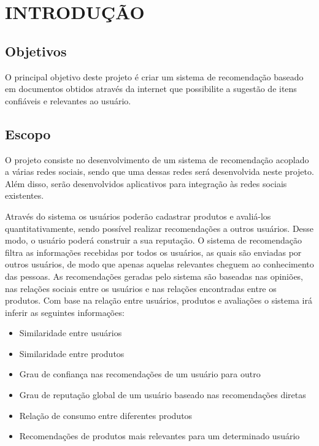 \chapter{INTRODUÇÃO} 

\section{Objetivos} %

 O principal objetivo deste projeto é criar um sistema de recomendação baseado em documentos obtidos através da internet que possibilite a sugestão de itens confiáveis e relevantes ao usuário.

\section{Escopo}

 O projeto consiste no desenvolvimento de um sistema de recomendação acoplado a várias redes sociais, sendo que uma dessas redes será desenvolvida neste projeto. Além disso, serão desenvolvidos aplicativos para integração às redes sociais existentes.

 Através do sistema os usuários poderão cadastrar produtos e avaliá-los quantitativamente, sendo possível realizar recomendações a outros usuários. Desse modo, o usuário poderá construir a sua reputação. O sistema de recomendação filtra as informações recebidas por todos os usuários, as quais são enviadas por outros usuários, de modo que apenas aquelas relevantes cheguem ao conhecimento das pessoas. As recomendações geradas pelo sistema são baseadas nas opiniões, nas relações sociais entre os usuários e nas relações encontradas entre os produtos. Com base na relação entre usuários, produtos e avaliações o sistema irá inferir as seguintes informações:
\begin{itemize}

 \item Similaridade entre usuários

 \item Similaridade entre produtos

 \item Grau de confiança nas recomendações de um usuário para outro

 \item Grau de reputação global de um usuário baseado nas recomendações diretas

 \item Relação de consumo entre diferentes produtos

 \item Recomendações de produtos mais relevantes para um determinado usuário

\end{itemize}

